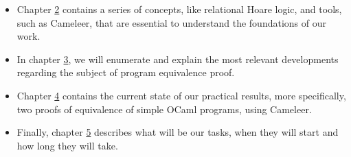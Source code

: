 \begin{itemize}
    \setlength\itemsep{0.1em}
    \item Chapter \hyperref[cha:background]{2} contains a series of concepts, like relational Hoare logic, and tools, such as Cameleer, that are essential to understand the foundations of our work.

    \item In chapter \hyperref[cha:state_of_the_art]{3}, we will enumerate and explain the most relevant developments regarding the subject of program equivalence proof.

    \item Chapter \hyperref[cha:preliminary_results]{4} contains the current state of our practical results, more specifically, two proofs of equivalence of simple OCaml programs, using Cameleer.

    \item Finally, chapter \hyperref[cha:work_plan]{5} describes what will be our tasks, when they will start and how long they will take.

\end{itemize}

